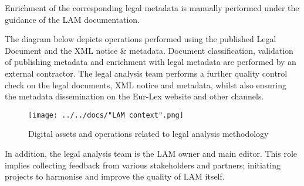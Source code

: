 Enrichment of the corresponding legal metadata is manually performed
under the guidance of the LAM documentation.

The diagram below depicts operations performed using the published Legal
Document and the XML notice \& metadata. Document classification,
validation of publishing metadata and enrichment with legal metadata are
performed by an external contractor. The legal analysis team performs a further quality control check on the
legal documents, XML notice and metadata, whilst also ensuring the metadata dissemination on the Eur-Lex website and other channels.

\begin{figure}[!ht]
\centering
\texttt{[image: ../../docs/"LAM context".png]}
\caption{Digital assets and operations related to legal
analysis methodology}
\end{figure}

In addition, the legal analysis team is the LAM owner and main editor.
This role implies collecting feedback from various stakeholders and
partners; initiating projects to harmonise and improve the quality of
LAM itself.
